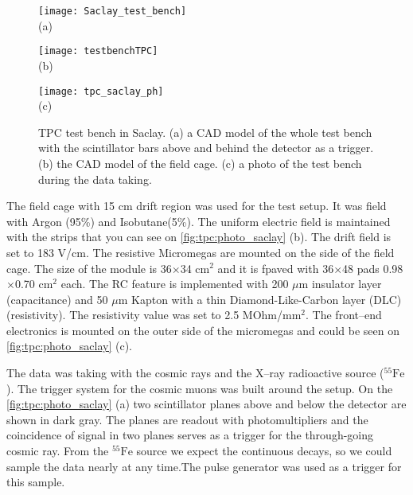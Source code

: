 \documentclass[../main.tex]{subfiles}
\begin{document}
\begin{figure}
  \begin{minipage}{0,33\linewidth}
    \centering
    \texttt{[image: Saclay\_test\_bench]} \\ (a)
  \end{minipage}
  \begin{minipage}{0,33\linewidth}
    \centering
    \texttt{[image: testbenchTPC]} \\ (b)
  \end{minipage}
  \begin{minipage}{0.33\linewidth}
    \centering
    \texttt{[image: tpc\_saclay\_ph]} \\ (c)
  \end{minipage}
  \caption{TPC test bench in Saclay. (a) a CAD model of the whole test bench with the scintillator bars above and behind the detector as a trigger. (b) the CAD model of the field cage. (c) a photo of the test bench during the data taking.}
  \label{fig:tpc:photo_saclay}
\end{figure}

The field cage with 15 cm drift region was used for the test setup. It was field with Argon (95\%) and Isobutane(5\%). The uniform electric field is maintained with the strips that you can see on \autoref{fig:tpc:photo_saclay} (b). The drift field is set to 183 V/cm. The resistive Micromegas are mounted on the side of the field cage. The size of the module is 36$\times$34 $\text{cm}^2$ and it is fpaved with 36$\times$48 pads 0.98$\times$0.70 $\text{cm}^2$ each. The RC feature is implemented with 200 $\mu\text{m}$ insulator layer (capacitance) and 50 $\mu\text{m}$ Kapton with a thin Diamond-Like-Carbon layer (DLC) (resistivity). The resistivity value was set to 2.5 MOhm/$\text{mm}^2$. The front--end electronics is mounted on the outer side of the micromegas and could be seen on \autoref{fig:tpc:photo_saclay} (c).

The data was taking with the cosmic rays and the X--ray radioactive source (${}^{55}\text{Fe}$). The trigger system for the cosmic muons was built around the setup. On the \autoref{fig:tpc:photo_saclay} (a) two scintillator planes above and below the detector are shown in dark gray. The planes are readout with photomultipliers and the coincidence of signal in two planes serves as a trigger for the through-going cosmic ray. From the ${}^{55}\text{Fe}$ source we expect the continuous decays, so we could sample the data nearly at any time.The pulse generator was used as a trigger for this sample.
\end{document}
